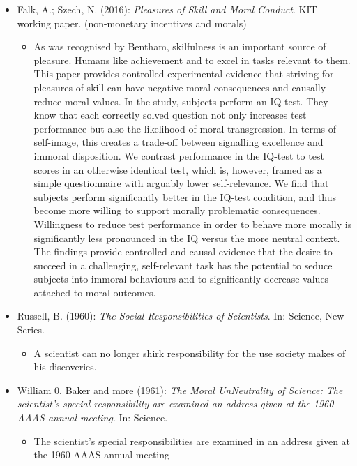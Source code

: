 \begin{itemize}
	\item Falk, A.; Szech, N. (2016): \textit{Pleasures of Skill and Moral Conduct}. KIT working paper. (non-monetary incentives and morals)
		\begin{itemize}
			\item As was recognised by Bentham, skilfulness is an important source of pleasure. Humans like achievement and to excel in tasks relevant to them. This paper provides controlled experimental evidence that striving for pleasures of skill can have negative moral consequences and causally reduce moral values. In the study, subjects perform an IQ-test. They know that each correctly solved question not only increases test performance but also the likelihood of moral transgression. In terms of self-image, this creates a trade-off between signalling excellence and immoral disposition. We contrast performance in the IQ-test to test scores in an otherwise identical test, which is, however, framed as a simple questionnaire with arguably lower self-relevance. We find that subjects perform significantly better in the IQ-test condition, and thus become more willing to support morally problematic consequences. Willingness to reduce test performance in order to behave more morally is significantly less pronounced in the IQ versus the more neutral context. The findings provide controlled and causal evidence that the desire to succeed in a challenging, self-relevant task has the potential to seduce subjects into immoral behaviours and to significantly decrease values attached to moral outcomes.
		\end{itemize}
	\item Russell, B. (1960): \textit{The Social Responsibilities of Scientists}. In: Science, New Series.
		\begin{itemize}
			\item A scientist can no longer shirk responsibility for the use society makes of his discoveries.
		\end{itemize}
	\item William 0. Baker and more (1961): \textit{The Moral UnNeutrality of Science: The scientist's special responsibility are examined an address given at the 1960 AAAS annual meeting}. In: Science.
		\begin{itemize}
			\item The scientist's special responsibilities are examined in an address given at the 1960 AAAS annual meeting
		\end{itemize}
\end{itemize}


\newpage